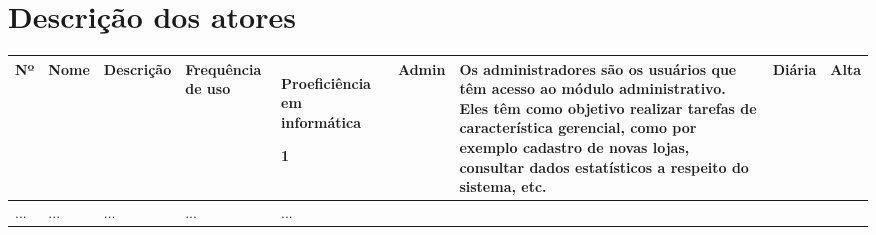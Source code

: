 \section{Descrição dos atores}

\begin{center}
    
    \begin{longtable}{|p{1cm}|p{2cm}|p{5cm}|p{3cm}|p{4cm}|}
    
        \hline
    
        \textbf{Nº} &
        \textbf{Nome} &
        \textbf{Descrição} &
        \textbf{Frequência de uso}  &
        \textbf{Proeficiência em informática} \endhead 
        
        \hline
        
        1 &
        Admin &
        Os administradores são os usuários que têm acesso ao módulo administrativo. Eles têm como objetivo realizar tarefas de característica gerencial, como por exemplo cadastro de novas lojas, consultar dados estatísticos a respeito do sistema, etc. &
        Diária &
        Alta \\ \hline
        
        ... & 
        ... &
        ... &
        ... &
        ... \\ \hline
    
    \end{longtable}
\end{center}